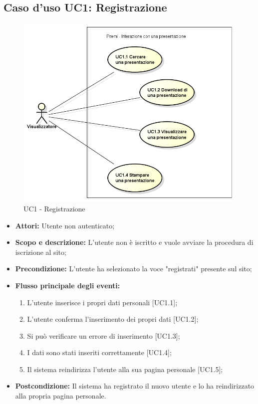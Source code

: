 \newpage
\subsection{Caso d'uso UC1: Registrazione}
\begin{figure}[h] 
	\centering 
	\includegraphics[scale=0.45] {img/UC1.png} 
	\caption{UC1 - Registrazione} 
\end{figure}

\begin{itemize}
	\item \textbf{Attori:} Utente non autenticato;
	\item \textbf{Scopo e descrizione:} L'utente non è iscritto e vuole avviare la procedura di iscrizione al sito;
	\item \textbf{Precondizione:} L'utente ha selezionato la voce "registrati" presente sul sito;
	\item \textbf{Flusso principale degli eventi:}
	\begin{enumerate}
		\item L'utente inserisce i propri dati personali [UC1.1];
		\item L'utente conferma l'inserimento dei propri dati [UC1.2];
		\item Si può verificare un errore di inserimento [UC1.3];
		\item I dati sono stati inseriti correttamente [UC1.4];
		\item Il sistema reindirizza l'utente alla sua pagina personale [UC1.5];
	\end{enumerate}
	\item \textbf{Postcondizione:} Il sistema ha registrato il nuovo utente e lo ha reindirizzato alla propria pagina personale.
\end{itemize}

